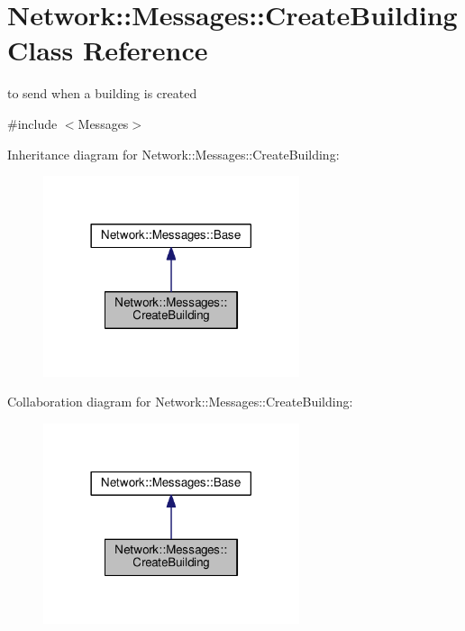 \hypertarget{class_network_1_1_messages_1_1_create_building}{}\section{Network\+:\+:Messages\+:\+:Create\+Building Class Reference}
\label{class_network_1_1_messages_1_1_create_building}


to send when a building is created  




{\ttfamily \#include $<$Messages$>$}



Inheritance diagram for Network\+:\+:Messages\+:\+:Create\+Building\+:
\nopagebreak
\begin{figure}[H]
\begin{center}
\leavevmode
\includegraphics[width=213pt]{class_network_1_1_messages_1_1_create_building__inherit__graph}
\end{center}
\end{figure}


Collaboration diagram for Network\+:\+:Messages\+:\+:Create\+Building\+:
\nopagebreak
\begin{figure}[H]
\begin{center}
\leavevmode
\includegraphics[width=213pt]{class_network_1_1_messages_1_1_create_building__coll__graph}
\end{center}
\end{figure}
